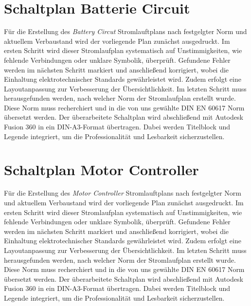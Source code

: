 \section*{Schaltplan Batterie Circuit}
Für die Erstellung des \textit{Battery Circut} Stromlauftplans nach festgelgter Norm und aktuellem Verbaustand wird der vorliegende Plan zunächst ausgedruckt. Im ersten Schritt wird dieser Stromlaufplan systematisch auf Unstimmigkeiten, wie fehlende Verbindungen oder unklare Symbolik, überprüft. Gefundene Fehler werden im nächsten Schritt markiert und anschließend korrigiert, wobei die Einhaltung elektrotechnischer Standards gewährleistet wird. Zudem erfolgt eine Layoutanpassung zur Verbesserung der Übersichtlichkeit. Im letzten Schritt muss herausgefunden werden, nach welcher Norm der Stromlaufplan erstellt wurde. Diese Norm muss recherchiert und in die von uns gewählte DIN EN 60617 Norm \glqq übersetzt\grqq {} werden. Der überarbeitete Schaltplan wird abschließend mit Autodesk Fusion 360 in ein DIN-A3-Format übertragen. Dabei werden Titelblock und Legende integriert, um die Professionalität und Lesbarkeit sicherzustellen. 
 

\addtocounter{page}{1} 
\section*{Schaltplan Motor Controller}
Für die Erstellung des \textit{Motor Controller} Stromlauftplans nach festgelgter Norm und aktuellem Verbaustand wird der vorliegende Plan zunächst ausgedruckt. Im ersten Schritt wird dieser Stromlaufplan systematisch auf Unstimmigkeiten, wie fehlende Verbindungen oder unklare Symbolik, überprüft. Gefundene Fehler werden im nächsten Schritt markiert und anschließend korrigiert, wobei die Einhaltung elektrotechnischer Standards gewährleistet wird. Zudem erfolgt eine Layoutanpassung zur Verbesserung der Übersichtlichkeit. Im letzten Schritt muss herausgefunden werden, nach welcher Norm der Stromlaufplan erstellt wurde. Diese Norm muss recherchiert und in die von uns gewählte DIN EN 60617 Norm \glqq übersetzt\grqq {} werden. Der überarbeitete Schaltplan wird abschließend mit Autodesk Fusion 360 in ein DIN-A3-Format übertragen. Dabei werden Titelblock und Legende integriert, um die Professionalität und Lesbarkeit sicherzustellen. 
 
\addtocounter{page}{1} 
